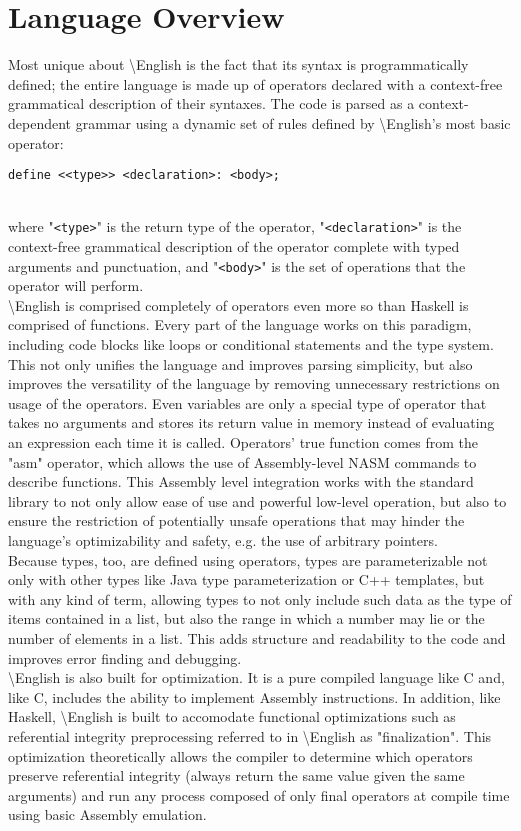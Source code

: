 \documentclass{article}
\newcommand{\name}{\textbackslash{}English}
\begin{document}
\section{Language Overview}
\indent Most unique about \name{} is the fact that its syntax is programmatically defined; the entire language is made up of operators declared with a context-free grammatical description of their syntaxes. The code is parsed as a context-dependent grammar using a dynamic set of rules defined by \name{}'s most basic operator:\\
\centerline{\texttt{define <<type>> <declaration>: <body>;}}\\
where "\verb+<type>+" is the return type of the operator, "\verb+<declaration>+" is the context-free grammatical description of the operator complete with typed arguments and punctuation, and "\verb+<body>+" is the set of operations that the operator will perform.\\
\indent \name{} is comprised completely of operators even more so than Haskell is comprised of functions. Every part of the language works on this paradigm, including code blocks like loops or conditional statements and the type system. This not only unifies the language and improves parsing simplicity, but also improves the versatility of the language by removing unnecessary restrictions on usage of the operators. Even variables are only a special type of operator that takes no arguments and stores its return value in memory instead of evaluating an expression each time it is called.
Operators' true function comes from the "asm" operator, which allows the use of Assembly-level NASM commands to describe functions. This Assembly level integration works with the standard library to not only allow ease of use and powerful low-level operation, but also to ensure the restriction of potentially unsafe operations that may hinder the language's optimizability and safety, e.g. the use of arbitrary pointers.\\
\indent Because types, too, are defined using operators, types are parameterizable not only with other types like Java type parameterization or C++ templates, but with any kind of term, allowing types to not only include such data as the type of items contained in a list, but also the range in which a number may lie or the number of elements in a list. This adds structure and readability to the code and improves error finding and debugging.\\
\indent \name{} is also built for optimization. It is a pure compiled language like C and, like C, includes the ability to implement Assembly instructions. In addition, like Haskell, \name{} is built to accomodate functional optimizations such as referential integrity preprocessing referred to in \name{} as "finalization". This optimization theoretically allows the compiler to determine which operators preserve referential integrity (always return the same value given the same arguments) and run any process composed of only final operators at compile time using basic Assembly emulation.\\
\end{document}
